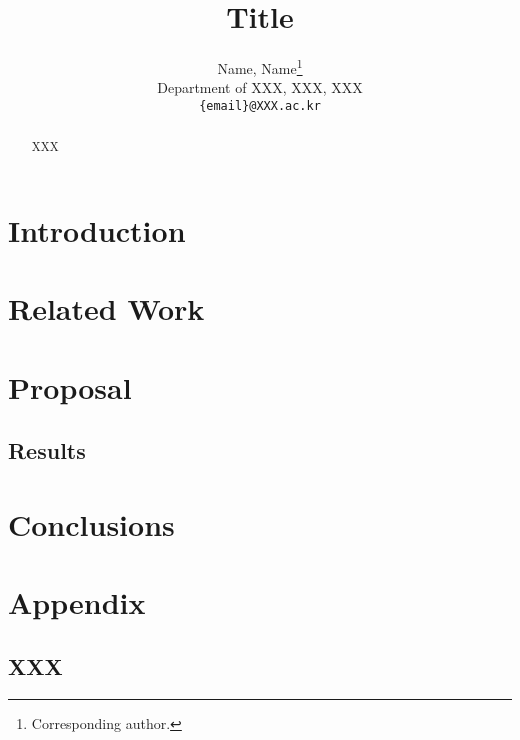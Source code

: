 \documentclass[10pt,twocolumn]{article}
\begin{document}
\title{Title}

\author{
  Name, Name\thanks{Corresponding author.} \\
  Department of XXX, XXX, XXX \\
  \texttt{\{email\}@XXX.ac.kr} \\
}

\maketitle
\thispagestyle{empty}

\begin{abstract}
XXX
\end{abstract}

\section{Introduction}
\label{sec:1}

\section{Related Work}
\label{sec:2}

\section{Proposal}
\label{sec:3}

\subsection{Results}
\label{sec:4}

\section{Conclusions}
\label{sec:5}




\newpage
\appendix
\onecolumn
\section{Appendix}

\subsection{XXX}
\label{app:1}
\end{document}
